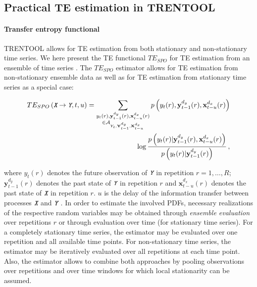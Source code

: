 \documentclass[a4paper,10pt]{article}
\begin{document}
\subsection{Practical TE estimation in TRENTOOL}\label{sec:practical_TE}


\paragraph*{Transfer entropy functional} TRENTOOL allows for TE estimation from both stationary and non-stationary time series. We here present the TE functional $TE_{SPO}$ for TE estimation from an ensemble of time series \cite{lindner2011,vicente2011,wibral2013,wollstadt2013}. The $TE_{SPO}$ estimator allows for TE estimation from non-stationary ensemble data as well as for TE estimation from stationary time series as a special case: 

\begin{equation}
\label{eq:TE_u}
\begin{split}
TE_{SPO}\left(\textit{\texttt{X}}\rightarrow \textit{\texttt{Y}},t,u\right)= \sum_{\substack{y_{t}(r),\mathbf{y}^{d_{y}}_{t-1}(r),\mathbf{x}^{d_{x}}_{t-u}(r)\\ \in \mathcal{A}_{Y_t,\mathbf{Y}_{t-1}^{d_y},\mathbf{X}_{t-u}^{d_x}}}} p\left( y_{t}(r), \mathbf{y}^{d_{y}}_{t-1}(r), \mathbf{x}^{d_{x}}_{t-u}(r)  \right) \\ 
\log \frac{p\left( y_{t}(r) | \mathbf{y}^{d_{y}}_{t-1}(r), \mathbf{x}^{d_{x}}_{t-u}(r) \right)}
  {p\left(y_{t}(r) | \mathbf{y}^{d_{y}}_{t-1}(r)\right)} \, , 
\end{split}
\end{equation}

where $y_t(r)$ denotes the future observation of $\textit{\texttt{Y}}$ in repetition $r=1,\ldots,R$; $\mathbf{y}^{d_{y}}_{t-1}(r)$ denotes the past state of $\textit{\texttt{Y}}$ in repetition $r$ and $\mathbf{x}^{d_{x}}_{t-u}(r)$ denotes the past state of $\textit{\texttt{X}}$ in repetition $r$. $u$ is the delay of the information transfer between processes $\textit{\texttt{X}}$ and $\textit{\texttt{Y}}$ \cite{wibral2013}. In order to estimate the involved PDFs, necessary realizations of the respective random variables may be obtained through \textit{ensemble evaluation} over repetitions $r$ or through evaluation over time (for stationary time series). For a completely stationary time series, the estimator may be evaluated over one repetition and all available time points. For non-stationary time series, the estimator may be iteratively evaluated over all repetitions at each time point. Also, the estimator allows to combine both approaches by pooling observations over repetitions and over time windows for 
which local stationarity can be assumed. 
\end{document}
